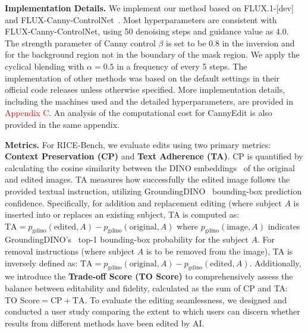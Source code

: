 \documentclass{article}
\begin{document}
\textbf{Implementation Details.} We implement our method based on FLUX.1-[dev]~\cite{blackforest2024FLUX} and FLUX-Canny-ControlNet~\cite{xlabsai2025fluxcontrolnet}. Most hyperparameters are consistent with FLUX-Canny-ControlNet, using 50 denoising steps and guidance value as 4.0. The strength parameter of Canny control $\beta$ is set to be 0.8 in the inversion and for the background region not in the boundary of the mask region. We apply the cyclical blending with $\alpha=0.5$ in a frequency of every 5 steps. The implementation of other methods was based on the default settings in their official code releases unless otherwise specified. More implementation details, including the machines used and the detailed hyperparameters, are provided in \textcolor{red}{Appendix C}. An analysis of the computational cost for CannyEdit is also provided in the same appendix. %




\textbf{Metrics.} For RICE-Bench, we evaluate edits using two primary metrics: \textbf{Context Preservation (CP)} and  \textbf{Text Adherence (TA)}. CP is quantified by calculating the cosine similarity between the DINO embeddings~\citep{caron2021emerging} of the original and edited images. TA measures how successfully the edited image follows the provided textual instruction, utilizing GroundingDINO~\citep{liu2024grounding} bounding-box prediction confidence. Specifically, for {addition} and {replacement} editing (where subject \(A\) is inserted into or replaces an existing subject, TA is computed as: $\text{TA} = p_{\text{gdino}}(\text{edited}, A) - p_{\text{gdino}}(\text{original}, A)$ where \(p_{\text{gdino}}(\text{image}, A)\) indicates GroundingDINO's~\citep{liu2024grounding} top-1 bounding-box probability for the subject \(A\). For {removal} instructions (where subject \(A\) is to be removed from the image), TA is inversely defined as: $\text{TA} = p_{\text{gdino}}(\text{original}, A) - p_{\text{gdino}}(\text{edited}, A)$. Additionally, we introduce the \textbf{Trade-off Score (TO Score)} to comprehensively assess the balance between editability and fidelity, calculated as the sum of CP and TA: $\text{TO Score} = \text{CP} + \text{TA}$. To evaluate the editing seamlessness, we designed and conducted a user study comparing the extent to which users can discern whether results from different methods have been edited by AI.
\end{document}
